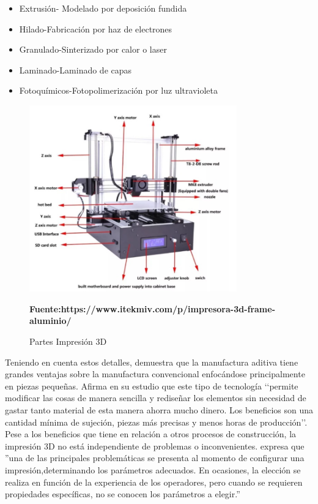 \begin{itemize}
  \item Extrusión- Modelado por deposición fundida
  \item Hilado-Fabricación por haz de electrones
  \item Granulado-Sinterizado por calor o laser
  \item Laminado-Laminado de capas
  \item Fotoquímicos-Fotopolimerización por luz ultravioleta
\end{itemize}

\begin{figure}[H]
    \centering
    \includegraphics[width=0.8\textwidth]{Figs/partes.PNG}
    \caption{Partes Impresión 3D}
    \textbf{Fuente:\:https://www.itekmiv.com/p/impresora-3d-frame-aluminio/}
     \label{fig:IMP3D}
\end{figure}

Teniendo en cuenta estos detalles, \citep{muller} demuestra que la manufactura aditiva tiene grandes ventajas sobre la manufactura convencional enfocándose principalmente en piezas pequeñas.  Afirma en su estudio que este tipo de tecnología ‘‘permite modificar las cosas de manera sencilla y rediseñar los elementos sin necesidad de gastar tanto material de esta manera ahorra mucho dinero. Los beneficios son una cantidad mínima de sujeción, piezas más precisas y menos horas de producción’’.  \\


Pese a los beneficios que tiene en relación a otros procesos de construcción, la impresión 3D no está independiente de problemas o inconvenientes.\citep{alvarez} expresa que ''una de las principales problemáticas se presenta al momento de configurar una impresión,determinando los parámetros adecuados. En ocasiones, la elección se realiza en función de la experiencia de los operadores, pero cuando se requieren propiedades específicas, no se conocen los parámetros a elegir.'' \\

